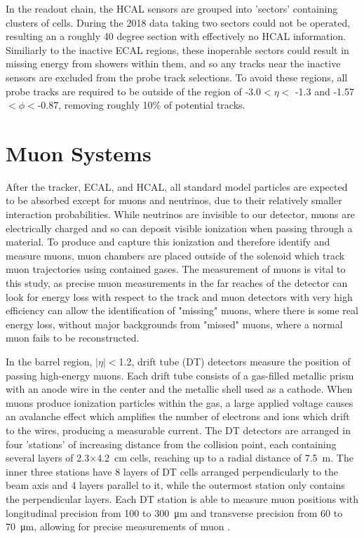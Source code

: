 In the readout chain, the HCAL sensors are grouped into 'sectors' containing clusters of cells. During the 2018 data taking two sectors could not be operated, resulting an a roughly 40 degree section with effectively no HCAL information. Similiarly to the inactive ECAL regions, these inoperable sectors could result in missing energy from showers within them, and so any tracks near the inactive sensors are excluded from the probe track selections. 
To avoid these regions, all probe tracks are required to be outside of the region of -3.0$<\eta<$ -1.3 and -1.57$<\phi<$-0.87, removing roughly 10$\%$ of potential tracks.

\section{Muon Systems}
After the tracker, ECAL, and HCAL, all standard model particles are expected to be absorbed except for muons and neutrinos, due to their relatively smaller interaction probabilities.
While neutrinos are invisible to our detector, muons are electrically charged and so can deposit visible ionization when passing through a material.
To produce and capture this ionization and therefore identify and measure muons, muon chambers are placed outside of the solenoid which track muon trajectories using contained gases.
The measurement of muons is vital to this study, as precise muon measurements in the far reaches of the detector can look for energy loss with respect to the track and muon detectors with very high efficiency can allow the identification of "missing" muons, where there is some real energy loss, without major backgrounds from "missed" muons, where a normal muon fails to be reconstructed.

In the barrel region, $\lvert\eta\rvert<$1.2, drift tube (DT) detectors measure the position of passing high-energy muons. 
Each drift tube consists of a gas-filled metallic prism with an anode wire in the center and the metallic shell used as a cathode.
When muons produce ionization particles within the gas, a large applied voltage causes an avalanche effect which amplifies the number of electrons and ions which drift to the wires, producing a measurable current.
The DT detectors are arranged in four 'stations' of increasing distance from the collision point, each containing several layers of 2.3$\times$\SI{4.2}{\centi\meter} cells, reaching up to a radial distance of \SI{7.5}{\meter}. 
The inner three stations have 8 layers of DT cells arranged perpendicularly to the beam axis and 4 layers parallel to it, while the outermost station only contains the perpendicular layers.
Each DT station is able to measure muon positions with longitudinal precision from 100 to \SI{300}{\micro\meter} and transverse precision from  60 to \SI{70}{\micro\meter}, allowing for precise measurements of muon \pt. 

